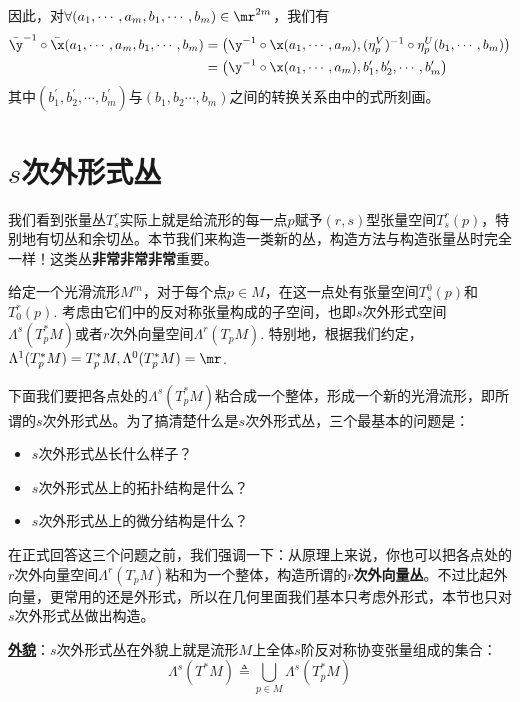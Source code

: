 因此，对$\forall (a_{1},\cdots,a_{m},b_{1},\cdots,b_{m})\in \mr^{2m}$，我们有
\[
\begin{split}
	\bar{\y }^{-1}\circ\bar{\x }( a_{1},\cdots,a_{m},b_{1},\cdots,b_{m})&= \bigl(\y^{-1}\circ\x (a_{1},\cdots,a_{m}),(\eta^{V}_{p} )^{-1}\circ \eta^{U}_{p}(b_{1},\cdots,b_{m}) \bigr)\\
	&=\bigl(\y^{-1}\circ\x (a_{1},\cdots,a_{m}),b^{\prime}_{1},b^{\prime}_{2},\cdots,b^{\prime}_{m} \bigr)
\end{split}
\]
其中$(b^{\prime}_{1},b^{\prime}_{2},\cdots,b^{\prime}_{m})$与$(b_{1},b_{2}\cdots,b_{m})$之间的转换关系由中的式所刻画。

\section{$s$次外形式丛}\label{s次外形式丛}

我们看到张量丛$T^{r}_{s}$实际上就是给流形的每一点$p$赋予$(r,s)$型张量空间$T^{r}_{s}(p)$，特别地有切丛和余切丛。本节我们来构造一类新的丛，构造方法与构造张量丛时完全一样！这类丛\textbf{非常非常非常}重要。

给定一个光滑流形$M^{m}$，对于每个点$p\in M$，在这一点处有张量空间$T^{0}_{s}(p)$和$T^{r}_{0}(p)$. 考虑由它们中的反对称张量构成的子空间，也即$s$次外形式空间$\Lambda^{s}(T^{\ast}_{p}M)$或者$r$次外向量空间$\Lambda^{r}(T_{p}M)$. 特别地，根据我们约定，$\Lambda^{1}(T^{\ast}_{p}M)=T^{\ast}_{p}M,\Lambda^{0}(T^{\ast}_{p}M)=\mr$. 

下面我们要把各点处的$\Lambda^{s}(T^{\ast}_{p}M)$粘合成一个整体，形成一个新的光滑流形，即所谓的$s$次外形式丛。为了搞清楚什么是$s$次外形式丛，三个最基本的问题是：
\begin{itemize}
	\item[(1)] $s$次外形式丛长什么样子？
	\item[(2)] $s$次外形式丛上的拓扑结构是什么？
	\item[(3)] $s$次外形式丛上的微分结构是什么？
\end{itemize}

在正式回答这三个问题之前，我们强调一下：从原理上来说，你也可以把各点处的$r$次外向量空间$\Lambda^{r}(T_{p}M)$粘和为一个整体，构造所谓的\textbf{$r$次外向量丛}。不过比起外向量，更常用的还是外形式，所以在几何里面我们基本只考虑外形式，本节也只对$s$次外形式丛做出构造。

\textbf{\underline{外貌}}：$s$次外形式丛在外貌上就是流形$M$上全体$s$阶反对称协变张量组成的集合：
		\[
			\Lambda^{s}(T^{\ast}M)\triangleq \bigcup\limits_{p\in M}\Lambda^{s}(T^{\ast}_{p}M)
		\]

